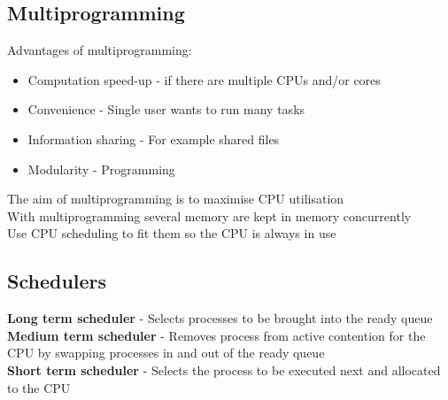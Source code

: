 \documentclass{article}[18pt]
\begin{document}
\subsection{Multiprogramming}
Advantages of multiprogramming:
\begin{itemize}
	\item Computation speed-up - if there are multiple CPUs and/or cores
	\item Convenience  - Single user wants to run many tasks
	\item Information sharing - For example shared files
	\item Modularity - Programming
\end{itemize}
The aim of multiprogramming is to maximise CPU utilisation\\
With multiprogramming several memory are kept in memory concurrently\\
Use CPU scheduling to fit them so the CPU is always in use
\subsection{Schedulers}
\textbf{Long term scheduler} - Selects processes to be brought into the ready queue\\
\textbf{Medium term scheduler} - Removes process from active contention for the CPU by swapping processes in and out of the ready queue\\
\textbf{Short term scheduler} - Selects the process to be executed next and allocated to the CPU
\end{document}

